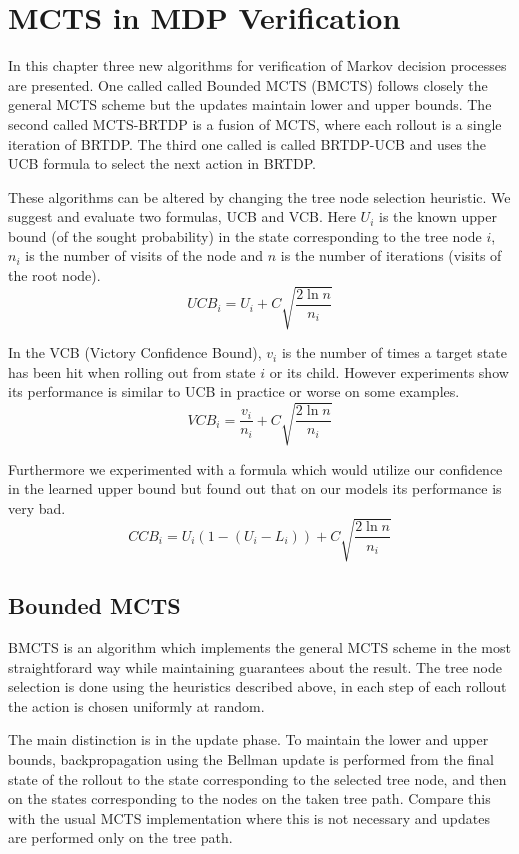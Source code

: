 \chapter{MCTS in MDP Verification}

In this chapter three new algorithms for verification of Markov decision
processes are presented. One called called Bounded MCTS (BMCTS) follows
closely the general MCTS scheme but the updates maintain lower and upper
bounds. The second called MCTS-BRTDP is a fusion of MCTS, where each
rollout is a single iteration of BRTDP.  The third one called is called
BRTDP-UCB and uses the UCB formula to select the next action in BRTDP.

These algorithms can be altered by changing the tree node selection
heuristic. We suggest and evaluate two formulas, UCB and VCB. Here $U_i$
is the known upper bound (of the sought probability) in the state
corresponding to the tree node $i$, $n_i$ is the number of visits of the
node and $n$ is the number of iterations (visits of
the root node).
\begin{equation*}
    UCB_i = U_i + C \sqrt{ \frac{2 \ln n}{n_i} }
\end{equation*}

In the VCB (Victory Confidence Bound), $v_i$ is the number of times a
target state has been hit when rolling out from state $i$ or its child.
However experiments show its performance is similar to UCB in
practice or worse on some examples.
\[
    VCB_i = \frac{v_i}{n_i} + C \sqrt{ \frac{2 \ln n}{n_i} }
\]

Furthermore we experimented with a formula which would utilize our
confidence in the learned upper bound but found out that on our models
its performance is very bad.
\[
    CCB_i = U_i (1 - (U_i - L_i)) + C \sqrt{ \frac{2 \ln n}{n_i} }
\]

\pagebreak

\section{Bounded MCTS}

BMCTS is an algorithm which implements the general MCTS scheme in the
most straightforard way while maintaining guarantees about the result.
The tree node selection is done using the
heuristics described above, in each step of each rollout the action is
chosen uniformly at random.

The main distinction is in the update phase. To maintain the lower and
upper bounds, backpropagation using the Bellman update is performed
from the final state of the rollout to the state corresponding to
the selected tree node, and then on the states corresponding to the
nodes on the taken tree path. Compare this with the usual MCTS
implementation where this is not necessary and updates are performed
only on the tree path.

